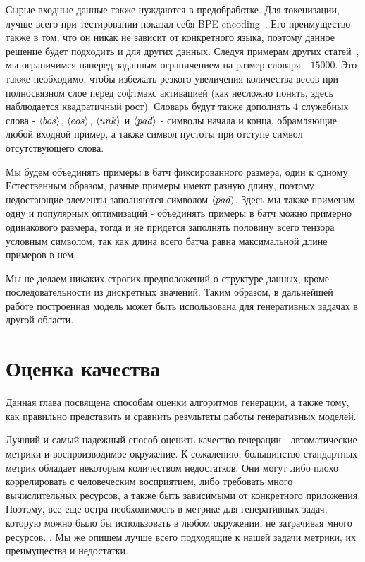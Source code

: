 \documentclass{spbau-diploma}
\begin{document}
Сырые входные данные также нуждаются в предобработке. Для токенизации, лучше 
всего при тестировании показал себя BPE encoding~\cite{wiki:bpe}. Его 
преимущество также в том, что он никак не зависит от конкретного языка, поэтому 
данное решение будет подходить и для других данных. Следуя примерам других 
статей~\cite{text_vae}, мы ограничимся наперед заданным ограничением на размер 
словаря - $15000$. Это также необходимо, чтобы избежать резкого увеличения 
количества весов при полносвязном слое перед софтмакс активацией (как несложно 
понять, здесь наблюдается квадратичный рост). Словарь будут также дополнять $4$ 
служебных слова - $\langle bos \rangle$, $\langle eos \rangle$, $\langle unk \rangle$ и $\langle pad \rangle$ - символы начала и конца, 
обрамляющие любой входной пример, а также символ пустоты при отступе символ
отсутствующего слова.

Мы будем объединять примеры в батч фиксированного размера, один к одному. 
Естественным образом, разные примеры имеют разную длину, поэтому недостающие
элементы заполняются символом $\langle pad \rangle$. Здесь мы также применим одну и популярных 
оптимизаций - объединять примеры в батч можно примерно одинакового размера, 
тогда и не придется заполнять половину всего тензора условным символом, так как 
длина всего батча равна максимальной длине примеров в нем.

Мы не делаем никаких строгих предположений о структуре данных, 
кроме последовательности из дискретных значений. 
Таким образом, в дальнейшей работе построенная модель может быть использована 
для генеративных задачах в другой области.

\section{Оценка качества}
Данная глава посвящена способам оценки алгоритмов генерации, а также тому, как 
правильно представить и сравнить результаты работы генеративных моделей.

Лучший и самый надежный способ оценить качество генерации - автоматические 
метрики и воспроизводимое окружение. К сожалению, большинство стандартных метрик
обладает некоторым количеством недостатков. Они могут либо плохо коррелировать
с человеческим восприятием, либо требовать много вычислительных 
ресурсов, а также быть зависимыми от конкретного приложения. Поэтому, все еще 
остра необходимость в метрике для генеративных задач, которую можно было бы 
использовать в любом окружении, не затрачивая много ресурсов.
\cite{book:salp}. Мы же опишем лучше всего подходящие к нашей задачи метрики, 
их преимущества и недостатки.
\end{document}
